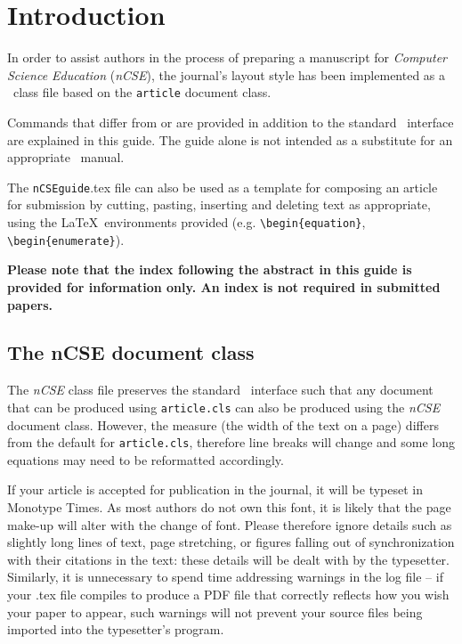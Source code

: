 \documentclass{nCSE2e}
\begin{document}
\section{Introduction}

In order to assist authors in the process of preparing a manuscript for {\itshape Computer Science Education} ({\it nCSE}), the journal's layout style has been implemented as a \LaTeXe\ class file based on the {\tt article} document class.

Commands that differ from or are provided in addition to the standard \LaTeXe\ interface are explained in this guide. The guide alone is not intended as a substitute for an appropriate \LaTeXe\ manual.

The {\tt nCSEguide}.tex file can also be used as a template for composing an article for submission by cutting, pasting, inserting and
deleting text as appropriate, using the \LaTeX\ environments provided (e.g. \verb"\begin{equation}", \verb"\begin{enumerate}").

\textbf{Please note that the index following the abstract in this guide is provided for information only. An index is not required in submitted papers.}


\subsection{The {\bi nCSE} document class}\label{S1.1}

The {\it nCSE} class file preserves the standard \LaTeXe\ interface such that any document that can
be produced using {\tt article.cls} can also be produced using the {\it nCSE} document class.
However, the measure (the width of the text on a page) differs from the default for {\tt article.cls}, therefore line breaks
will change and some long equations may need to be reformatted accordingly.

If your article is accepted for publication in the journal, it will be typeset in Monotype Times. As most authors do not own this font, it is likely that the page make-up will alter with the change of font. Please therefore ignore details such as slightly long lines of text, page stretching, or figures falling out of synchronization with their citations in the text: these details will be dealt with by the typesetter. Similarly, it is unnecessary to spend time addressing warnings in the log file -- if your .tex file compiles to produce a PDF file that correctly reflects how you wish your paper to appear, such warnings will not prevent your source files being imported into the typesetter's program.
\end{document}
